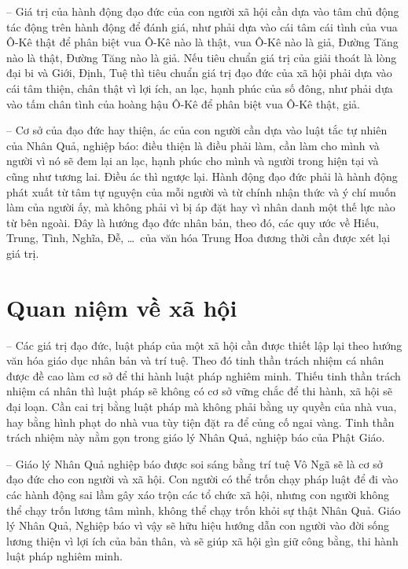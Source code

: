 -- Giá trị của hành động đạo đức của con người xã hội cần dựa vào tâm chủ động tác động trên hành động để đánh giá, như phải dựa vào cái tâm cái tình của vua Ô-Kê thật để phân biệt vua Ô-Kê nào là thật, vua Ô-Kê nào là giả, Đường Tăng nào là thật, Đường Tăng nào là giả. Nếu tiêu chuẩn giá trị của giải thoát là lòng đại bi và Giới, Định, Tuệ thì tiêu chuẩn giá trị đạo đức của xã hội phải dựa vào cái tâm thiện, chân thật vì lợi ích, an lạc, hạnh phúc của số đông, như phải dựa vào tấm chân tình của hoàng hậu Ô-Kê để phân biệt vua Ô-Kê thật, giả.

-- Cơ sở của đạo đức hay thiện, ác của con người cần dựa vào luật tắc tự nhiên của Nhân Quả, nghiệp báo: điều thiện là điều phải làm, cần làm cho mình và người vì nó sẽ đem lại an lạc, hạnh phúc cho mình và người trong hiện tại và cũng như tương lai. Điều ác thì ngược lại. Hành động đạo đức phải là hành động phát xuất từ tâm tự nguyện của mỗi người và từ chính nhận thức và ý chí muốn làm của người ấy, mà không phải vì bị áp đặt hay vì nhân danh một thế lực nào từ bên ngoài. Đây là hướng đạo đức nhân bản, theo đó, các quy ước về Hiếu, Trung, Tình, Nghĩa, Đễ, \ldots ~của văn hóa Trung Hoa đương thời cần được xét lại giá trị.

\section{Quan niệm về xã hội} %
\label{sec:36_37_xa_hoi}

-- Các giá trị đạo đức, luật pháp của một xã hội cần được thiết lập lại theo hướng văn hóa giáo dục nhân bản và trí tuệ. Theo đó tinh thần trách nhiệm cá nhân được đề cao làm cơ sở để thi hành luật pháp nghiêm minh. Thiếu tinh thần trách nhiệm cá nhân thì luật pháp sẽ không có cơ sở vững chắc để thi hành, xã hội sẽ đại loạn. Cần cai trị bằng luật pháp mà không phải bằng uy quyền của nhà vua, hay bằng hình phạt do nhà vua tùy tiện đặt ra để củng cố ngai vàng. Tinh thần trách nhiệm này nằm gọn trong giáo lý Nhân Quả, nghiệp báo của Phật Giáo.

-- Giáo lý Nhân Quả nghiệp báo được soi sáng bằng trí tuệ Vô Ngã sẽ là cơ sở đạo đức cho con người và xã hội. Con người có thể trốn chạy pháp luật để đi vào các hành động sai lầm gây xáo trộn các tổ chức xã hội, nhưng con người không thể chạy trốn lương tâm mình, không thể chạy trốn khỏi sự thật Nhân Quả. Giáo lý Nhân Quả, Nghiệp báo vì vậy sẽ hữu hiệu hướng dẫn con người vào đời sống lương thiện vì lợi ích của bản thân, và sẽ giúp xã hội gìn giữ công bằng, thi hành luật pháp nghiêm minh.

